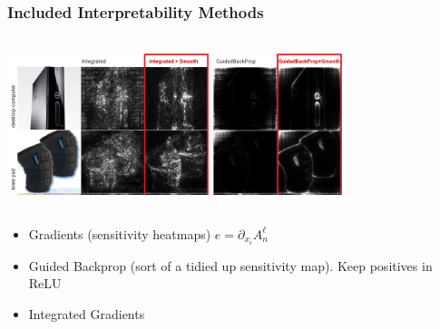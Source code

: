 \documentclass{beamer}
\theoremstyle{mystyle}
\begin{document}
\begin{frame}
	\frametitle{Included Interpretability Methods}
	\includegraphics[width=10cm, height=5cm]{compareSGBP.png}

	\begin{itemize}
	
	\item Gradients (sensitivity heatmaps) $e = \partial_{x_i} A_n^{\ell} $ \pause

	\item Guided Backprop (sort of a tidied up sensitivity map). Keep positives in ReLU \pause
	\item Integrated Gradients
	
	\end{itemize}
\end{frame}
\end{document}
